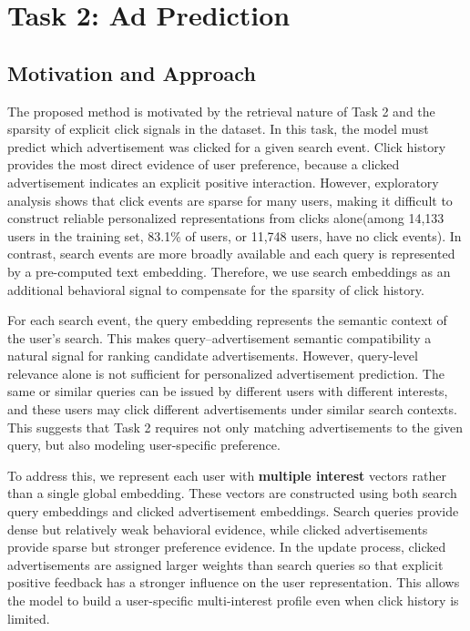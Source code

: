 \documentclass[sigconf, nonacm]{acmart}
\begin{document}
\section{Task 2: Ad Prediction}
\label{sec:task2}

\subsection{Motivation and Approach}

The proposed method is motivated by the retrieval nature of Task 2 and the sparsity of explicit click signals in the dataset. In this task, the model must predict which advertisement was clicked for a given search event. Click history provides the most direct evidence of user preference, because a clicked advertisement indicates an explicit positive interaction. However, exploratory analysis shows that click events are sparse for many users, making it difficult to construct reliable personalized representations from clicks alone(among 14,133 users in the training set, 83.1\% of users, or 11,748 users, have no click events). In contrast, search events are more broadly available and each query is represented by a pre-computed text embedding. Therefore, we use search embeddings as an additional behavioral signal to compensate for the sparsity of click history.

For each search event, the query embedding represents the semantic context of the user’s search. This makes query--advertisement semantic compatibility a natural signal for ranking candidate advertisements. However, query-level relevance alone is not sufficient for personalized advertisement prediction. The same or similar queries can be issued by different users with different interests, and these users may click different advertisements under similar search contexts. This suggests that Task 2 requires not only matching advertisements to the given query, but also modeling user-specific preference.

To address this, we represent each user with \textbf{multiple interest} vectors rather than a single global embedding. These vectors are constructed using both search query embeddings and clicked advertisement embeddings. Search queries provide dense but relatively weak behavioral evidence, while clicked advertisements provide sparse but stronger preference evidence. In the update process, clicked advertisements are assigned larger weights than search queries so that explicit positive feedback has a stronger influence on the user representation. This allows the model to build a user-specific multi-interest profile even when click history is limited. 
\end{document}
